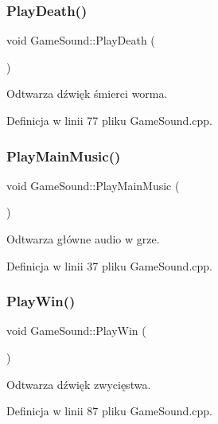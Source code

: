 \subsubsection{\texorpdfstring{Play\+Death()}{PlayDeath()}}
{\footnotesize\ttfamily void Game\+Sound\+::\+Play\+Death (\begin{DoxyParamCaption}{ }\end{DoxyParamCaption})}



Odtwarza dźwięk śmierci worma. 



Definicja w linii 77 pliku Game\+Sound.\+cpp.

\mbox{\label{class_game_sound_ad89f0cfad75194e895cb68437f9c231f}} 
\subsubsection{\texorpdfstring{Play\+Main\+Music()}{PlayMainMusic()}}
{\footnotesize\ttfamily void Game\+Sound\+::\+Play\+Main\+Music (\begin{DoxyParamCaption}{ }\end{DoxyParamCaption})}



Odtwarza główne audio w grze. 



Definicja w linii 37 pliku Game\+Sound.\+cpp.

\mbox{\label{class_game_sound_a429befa039bfc4e9f7b33326fbb090a4}} 
\subsubsection{\texorpdfstring{Play\+Win()}{PlayWin()}}
{\footnotesize\ttfamily void Game\+Sound\+::\+Play\+Win (\begin{DoxyParamCaption}{ }\end{DoxyParamCaption})}



Odtwarza dźwięk zwycięstwa. 



Definicja w linii 87 pliku Game\+Sound.\+cpp.

